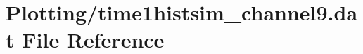 \hypertarget{Plotting_2time1histsim__channel9_8dat}{}\section{Plotting/time1histsim\+\_\+channel9.dat File Reference}
\label{Plotting_2time1histsim__channel9_8dat}
